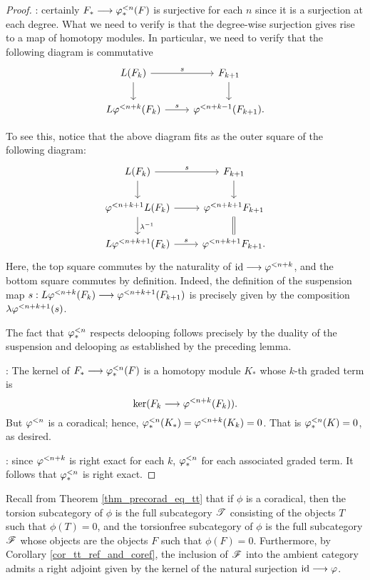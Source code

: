 \begin{proof}
 : certainly $F_* \longrightarrow 
\varphi^{< n}_{*}(F)$ is surjective for each $n$ since it is a surjection 
at each degree. What we need to verify is that the degree-wise 
surjection gives rise to a map of homotopy modules. In particular, 
we need to verify that the following diagram is commutative
\[
\begin{tikzcd}
L(F_k) \arrow{r}{\susp} \arrow{d} &
F_{k + 1} \arrow{d} \\
L \tlHI{n + k}(F_k) \arrow{r}{\susp} &
\tlHI{n + k - 1}(F_{k + 1}).
\end{tikzcd}
\]

To see this, notice that the above diagram fits as the outer 
square of the following diagram:
\[
\begin{tikzcd}
L(F_k) \arrow{r}{\susp} \arrow{d} &
F_{k + 1} \arrow{d} \\
\tlHI{n + k + 1} L(F_k) \arrow{r} \arrow{d}{\lambda^{-1}} &
\tlHI{n + k + 1} F_{k + 1} \arrow[equals]{d} \\
L \tlHI{n + k + 1}(F_k) \arrow{r}{\susp} &
\tlHI{n + k + 1} F_{k + 1}.
\end{tikzcd}
\]
Here, the top square commutes by the naturality of $\mathrm{id} \longrightarrow 
\varphi^{< n + k}$, and the bottom square commutes by definition. 
Indeed, the definition of the suspension map 
$s: L \varphi^{< n + k}(F_k) \longrightarrow \varphi^{< n + k + 1}(F_{k + 1})$ is 
precisely given by the composition 
$\lambda \varphi^{< n + k + 1}(s)$.

The fact that $\varphi^{< n}_{*}$ respects delooping follows precisely by
the duality of the suspension and delooping as established by the
preceding lemma.

 : The kernel of $F_* \longrightarrow 
\varphi^{< n}_{*}(F)$ is a homotopy module $K_*$ whose $k$-th graded term is 
\[
\mathrm{ker}(F_k \longrightarrow \varphi^{< n + k}(F_k)). 
\]
But $\varphi^{< n}$ is a coradical; hence, $\varphi^{< n}_{*}(K_*) = 
\varphi^{< n + k}(K_k) = 0$. That is $\varphi^{< n}_{*}(K) = 0$, as desired.

 : since $\varphi^{< n + k}$ is 
right exact for each $k$, $\varphi^{< n}_{*}$ for each associated graded 
term. It follows that $\varphi^{< n}_{*}$ is right exact.
\end{proof}

Recall from Theorem \ref{thm_precorad_eq_tt} that if $\phi$ is 
a coradical, then the torsion subcategory of $\phi$ is the full 
subcategory $\mathscr{T}$ consisting of the objects $T$ such that 
$\phi(T) = 0$, and the torsionfree subcategory of $\phi$ is the 
full subcategory $\mathscr{F}$ whose objects are the objects $F$ such 
that $\phi(F) = 0$. Furthermore, by Corollary 
\ref{cor_tt_ref_and_coref}, the inclusion of $\mathscr{F}$ into the
ambient category admits a right adjoint given by the kernel of
the natural surjection $\mathrm{id} \longrightarrow \varphi$. 

